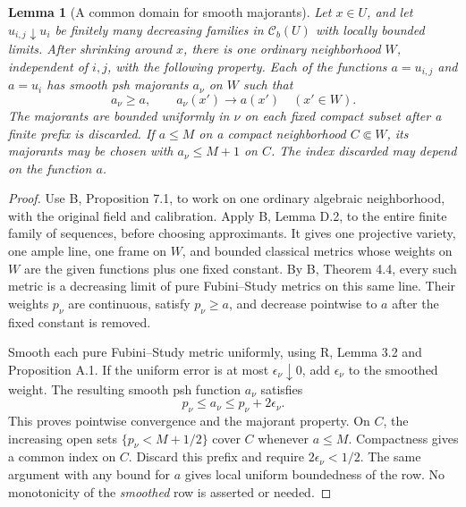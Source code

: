 \documentclass[11pt,a4paper]{article}
\numberwithin{equation}{section}
\newtheorem{lemma}[theorem]{Lemma}
\theoremstyle{definition}
\theoremstyle{remark}
\newcommand{\Cb}{\mathcal C_b}
\begin{document}
\begin{lemma}[A common domain for smooth majorants]
\label{lem:common-majorants}
Let $x\in U$, and let $u_{i,j}\downarrow u_i$ be finitely many decreasing
families in $\Cb(U)$ with locally bounded limits. After shrinking around
$x$, there is one ordinary neighborhood $W$, independent of $i,j$, with
the following property. Each of the functions $a=u_{i,j}$ and $a=u_i$
has smooth psh majorants $a_\nu$ on $W$ such that
\[
 a_\nu\geq a,\qquad a_\nu(x')\longrightarrow a(x')\quad(x'\in W).
\]
The majorants are bounded uniformly in $\nu$ on each fixed compact subset
after a finite prefix is discarded. If $a\leq M$ on a compact neighborhood
$C\Subset W$, its majorants may be chosen with $a_\nu\leq M+1$ on $C$.
The index discarded may depend on the function $a$.
\end{lemma}

\begin{proof}
Use \textup{B}, Proposition 7.1, to work on one ordinary algebraic
neighborhood, with the original field and calibration. Apply \textup{B},
Lemma D.2, to the entire finite family of sequences, before choosing
approximants. It gives one projective variety, one ample line, one frame
on $W$, and bounded classical metrics whose weights on $W$ are the given
functions plus one fixed constant. By \textup{B}, Theorem 4.4, every such
metric is a decreasing limit of pure Fubini--Study metrics on this same
line. Their weights $p_\nu$ are continuous, satisfy $p_\nu\geq a$, and
decrease pointwise to $a$ after the fixed constant is removed.

Smooth each pure Fubini--Study metric uniformly, using \textup{R},
Lemma 3.2 and Proposition A.1. If the uniform error is at most
$\epsilon_\nu\downarrow0$, add $\epsilon_\nu$ to the smoothed weight.
The resulting smooth psh function $a_\nu$ satisfies
\[
 p_\nu\leq a_\nu\leq p_\nu+2\epsilon_\nu.
\]
This proves pointwise convergence and the majorant property.
On $C$, the increasing open sets $\{p_\nu<M+1/2\}$ cover $C$ whenever
$a\leq M$. Compactness gives a common index on $C$. Discard this prefix
and require $2\epsilon_\nu<1/2$. The same argument with any bound for
$a$ gives local uniform boundedness of the row. No monotonicity of the
\emph{smoothed} row is asserted or needed.
\end{proof}
\end{document}
